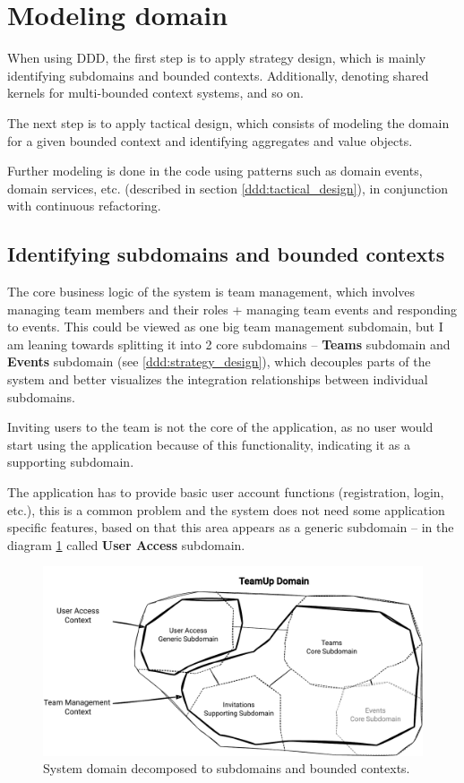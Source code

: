 \section{Modeling domain}
\label{dev:modeling}
When using DDD, the first step is to apply strategy design, which is mainly identifying subdomains and bounded contexts. Additionally, denoting shared kernels for multi-bounded context systems, and so on.

The next step is to apply tactical design, which consists of modeling the domain for a given bounded context and identifying  aggregates and value objects. 

Further modeling is done in the code using patterns such as domain events, domain services, etc. (described in section \ref{ddd:tactical_design}), in conjunction with continuous refactoring.

\subsection{Identifying subdomains and bounded contexts}
The core business logic of the system is team management, which involves managing team members and their roles + managing team events and responding to events. This could be viewed as one big team management subdomain, but I am leaning towards splitting it into 2 core subdomains -- \textbf{Teams} subdomain and \textbf{Events} subdomain (see \ref{ddd:strategy_design}), which decouples parts of the system and better visualizes the integration relationships between individual subdomains.

Inviting users to the team is not the core of the application, as no user would start using the application because of this functionality, indicating it as a supporting subdomain.

The application has to provide basic user account functions (registration, login, etc.), this is a common problem and the system does not need some application specific features, based on that this area appears as a generic subdomain -- in the diagram \ref{fig:teamup-strategy-design} called \textbf{User Access} subdomain.

\begin{figure} [H]
    \centering
    \includegraphics[width=\textwidth]{figures/teamup-strategy-design.pdf}
    \caption{System domain decomposed to subdomains and bounded contexts.}
    \label{fig:teamup-strategy-design}
\end{figure}

